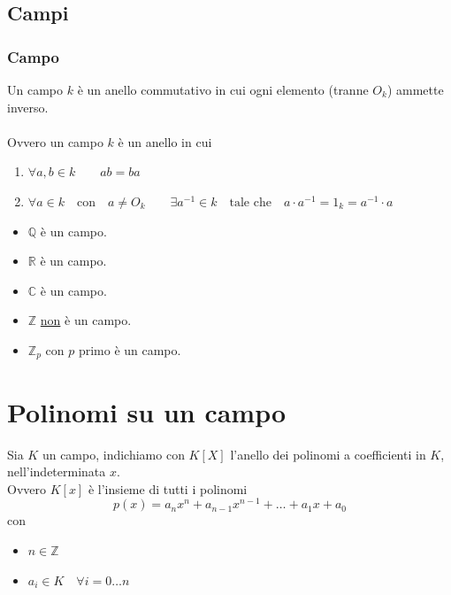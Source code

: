 \documentclass[a4paper,12pt, oneside]{book}
\begin{document}
\section{Campi}
\subsection{Campo}

\begin{definizione}[Campo]
	Un campo $k$ è un anello commutativo in cui ogni elemento (tranne $O_k$) ammette inverso.\\\\
	Ovvero un campo $k$ è un anello in cui
	\begin{enumerate}
		\item $\forall a,b \in k \qquad ab=ba$
		\item $\forall a \in k \quad \mbox{con} \quad a \not = O_k \qquad \exists a^{-1}  \in k \quad \mbox{tale che} \quad a \cdot a^{-1} = 1_k = a^{-1} \cdot a$
	\end{enumerate}
\end{definizione}

\begin{shaded}
	\begin{esempio}
		\begin{itemize}
			Esempi pratici:
			\item $\mathbb{Q}$ è un campo.
			\item $\mathbb{R}$ è un campo.
			\item $\mathbb{C}$ è un campo.
			\item $\mathbb{Z}$ \underline{non} è un campo.
			\item $\mathbb{Z}_{p}$ con $p$ primo è un campo.
		\end{itemize}
	\end{esempio}
\end{shaded}

\chapter{Polinomi su un campo}
Sia $K$ un campo, indichiamo con $K[X]$ l'anello dei polinomi a coefficienti in $K$, nell'indeterminata $x$.\\
Ovvero $K[x]$ è l'insieme di tutti i polinomi
$$p(x) = a_{n}x^{n} + a_{n-1}x^{n-1} + \dots + a_{1}x + a_{0}$$
con \begin{itemize}
	\item $n \in \mathbb{Z}$
	\item $a_i \in K \quad \forall i = 0 \dots n$
\end{itemize}
\end{document}
